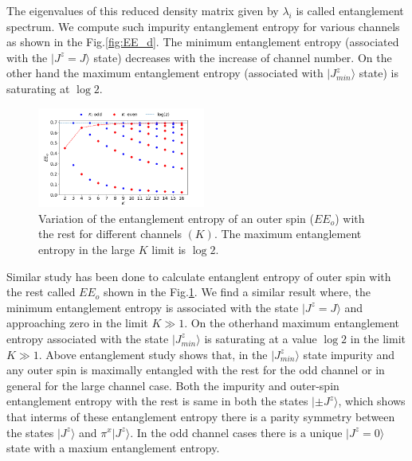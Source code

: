 \documentclass[reprint,prb,superscriptaddress]{revtex4-2}
\begin{document}
\noindent The eigenvalues of this reduced density matrix given by $\lambda_i$ is called entanglement spectrum. We compute such impurity entanglement entropy for various channels as shown in the Fig.\ref{fig:EE_d}. The minimum entanglement entropy (associated with the $|J^z=J\rangle$ state) decreases with the increase of channel number. On the other hand the maximum entanglement entropy (associated with $|J^z_{min}\rangle$ state) is saturating at $\log 2$. 
\begin{figure}[!htpb]
\centering
\includegraphics[width=0.49\textwidth]{plt/outer_EE_multi_channel_ANN.png}
\caption{Variation of the entanglement entropy of an outer spin ($EE_o$) with the rest for different channels $(K)$. The maximum entanglement entropy in the large $K$ limit is $\log 2$.}
\label{fig:EE_outer}
\end{figure}
Similar study has been done to calculate entanglent entropy of outer spin with the rest called $EE_o$ shown in the Fig.\ref{fig:EE_outer}.
%
%
We find a similar result where, the minimum entanglement entropy is associated with the state $|J^z=J\rangle$ and approaching zero in the limit $K\gg 1$. On the otherhand maximum entanglement entropy associated with the state $|J^z_{min}\rangle$ is saturating at a value $\log 2$ in the limit $K\gg 1$. Above entanglement study shows that, in the $|J^z_{min}\rangle$ state impurity and any outer spin is maximally entangled with the rest for the odd channel or in general for the large channel case. Both the impurity and outer-spin entanglement entropy with the rest is same in both the states $|\pm J^z\rangle$, which shows that interms of these entanglement entropy there is a parity symmetry between the states $|J^z\rangle$ and $\pi^{x} |J^z\rangle$. In the odd channel cases there is a unique $|J^z=0\rangle$ state with a maxium entanglement entropy. 
\end{document}
